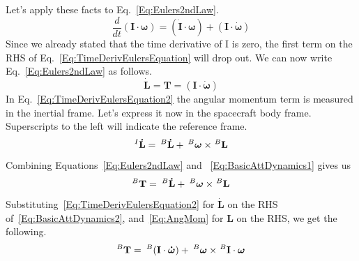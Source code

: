 Let's apply these facts to Eq.~\ref{Eq:Eulers2ndLaw}.
%
\begin{equation}
    \frac{d}{dt}(\mathbf{I}\cdot\boldsymbol{\omega}) =
        (\mathbf{\dot{I}}\cdot\boldsymbol{\omega})+(\mathbf{I}\cdot\boldsymbol{\dot{\omega}})
    \label{Eq:TimeDerivEulersEquation}
\end{equation}
%
Since we already stated that the time derivative of I is zero, the first term
on the RHS of Eq.~\ref{Eq:TimeDerivEulersEquation} will drop out.  We can now
write Eq.~\ref{Eq:Eulers2ndLaw} as follows.
%
\begin{equation}
	\mathbf{\dot{L}} =
        \mathbf{T} =
        (\mathbf{I}\cdot\boldsymbol{\dot{\omega}})
    \label{Eq:TimeDerivEulersEquation2}
\end{equation}
%
In Eq.~\ref{Eq:TimeDerivEulersEquation2} the angular momentum term is measured
in the inertial frame.  Let's express it now in the spacecraft body frame.
Superscripts to the left will indicate the reference frame.
%
\begin{equation}
    ^{I}\mathbf{\dot{L}} = \hspace{0.082cm}
        ^{B}\mathbf{\dot{L}} + \hspace{0.082cm} ^{B}\boldsymbol{\omega} \times \hspace{0.03cm} ^{B}\mathbf{L}
    \label{Eq:BasicAttDynamics1}
\end{equation}
%
Combining Equations~\ref{Eq:Eulers2ndLaw} and ~\ref{Eq:BasicAttDynamics1} gives
us
%
\begin{equation}
    ^{B}\mathbf{T} = \hspace{0.082cm}
        ^{B}\mathbf{\dot{L}} + \hspace{0.082cm} ^{B}\boldsymbol{\omega} \times \hspace{0.03cm} ^{B}\mathbf{L}
    \label{Eq:BasicAttDynamics2}
\end{equation}
%
Substituting~\ref{Eq:TimeDerivEulersEquation2} for $\mathbf{\dot{L}}$ on the RHS
of~\ref{Eq:BasicAttDynamics2}, and~\ref{Eq:AngMom} for $\mathbf{L}$ on the RHS,
we get the following.
%
\begin{equation}
    ^{B}\mathbf{T} = \hspace{0.082cm}
        ^{B}(\mathbf{I}\cdot\boldsymbol{\dot{\omega}}) +
        \hspace{0.082cm} ^{B}\boldsymbol{\omega} \times \hspace{0.03cm} ^{B}\mathbf{I} \cdot \boldsymbol{\omega}
    \label{Eq:BasicAttDynamics3}
\end{equation}
